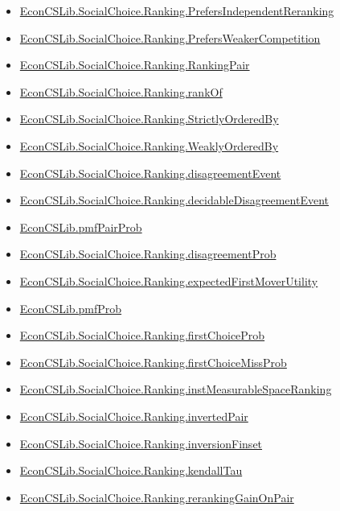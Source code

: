 \documentclass[10pt]{article}
\begin{document}
\begin{itemize}[leftmargin=1.2em]
\begin{itemize}[leftmargin=1.2em]
\item \hyperlink{library-prerequisite-a891c9f796ceb814}{EconCSLib.SocialChoice.Ranking.PrefersIndependentReranking}
\item \hyperlink{library-prerequisite-8db06726f0f2eba3}{EconCSLib.SocialChoice.Ranking.PrefersWeakerCompetition}
\item \hyperlink{library-prerequisite-9e722a7603183d67}{EconCSLib.SocialChoice.Ranking.RankingPair}
\item \hyperlink{library-prerequisite-ffa701659b5a9425}{EconCSLib.SocialChoice.Ranking.rankOf}
\item \hyperlink{library-prerequisite-150c4e692433d71a}{EconCSLib.SocialChoice.Ranking.StrictlyOrderedBy}
\item \hyperlink{library-prerequisite-8b25302a88abab0b}{EconCSLib.SocialChoice.Ranking.WeaklyOrderedBy}
\item \hyperlink{library-prerequisite-73e694b78a9c1a15}{EconCSLib.SocialChoice.Ranking.disagreementEvent}
\item \hyperlink{library-prerequisite-ee43c221688d5474}{EconCSLib.SocialChoice.Ranking.decidableDisagreementEvent}
\item \hyperlink{library-prerequisite-5875c858a5dee439}{EconCSLib.pmfPairProb}
\item \hyperlink{library-prerequisite-f084d92aa50ed2fc}{EconCSLib.SocialChoice.Ranking.disagreementProb}
\item \hyperlink{library-prerequisite-550af61d293e17c6}{EconCSLib.SocialChoice.Ranking.expectedFirstMoverUtility}
\item \hyperlink{library-prerequisite-7fec9dedef722fc8}{EconCSLib.pmfProb}
\item \hyperlink{library-prerequisite-60202fed8e52e293}{EconCSLib.SocialChoice.Ranking.firstChoiceProb}
\item \hyperlink{library-prerequisite-ce32083db4914ab9}{EconCSLib.SocialChoice.Ranking.firstChoiceMissProb}
\item \hyperlink{library-prerequisite-dab3c208272a262f}{EconCSLib.SocialChoice.Ranking.instMeasurableSpaceRanking}
\item \hyperlink{library-prerequisite-3b92294c8958cd6a}{EconCSLib.SocialChoice.Ranking.invertedPair}
\item \hyperlink{library-prerequisite-0bcb643e4e8f308c}{EconCSLib.SocialChoice.Ranking.inversionFinset}
\item \hyperlink{library-prerequisite-bba935eca4d406d8}{EconCSLib.SocialChoice.Ranking.kendallTau}
\item \hyperlink{library-prerequisite-02920becedba7938}{EconCSLib.SocialChoice.Ranking.rerankingGainOnPair}

\end{itemize}
\end{itemize}
\end{document}
